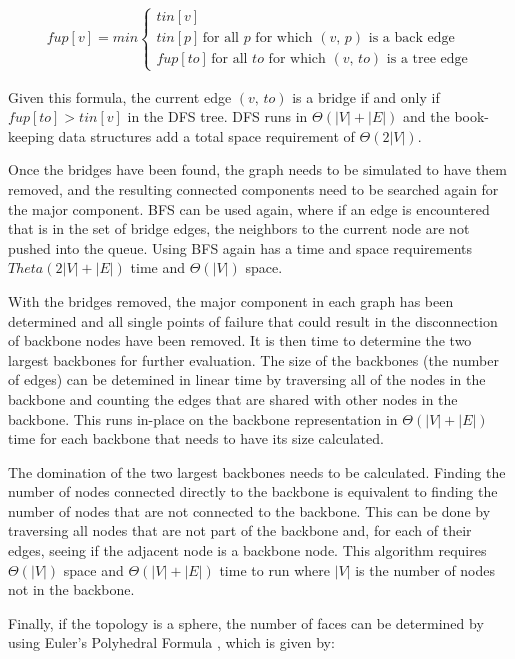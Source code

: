 \documentclass{article}
\begin{document}
        \begin{align}
            fup[v] = min
            \begin{cases}
                tin[v] \\
                tin[p]\,\text{for all $p$ for which $(v,\,p)$ is a back edge} \\
                fup[to]\,\text{for all $to$ for which $(v,\,to)$ is a tree edge}
            \end{cases}
        \end{align}

        Given this formula, the current edge $(v,\,to)$ is a bridge if and only if $fup[to] > tin[v]$ in the DFS tree. DFS runs in $\Theta(|V| + |E|)$ and the book-keeping data structures add a total space requirement of $\Theta(2|V|)$.
        \par
        Once the bridges have been found, the graph needs to be simulated to have them removed, and the resulting connected components need to be searched again for the major component. BFS can be used again, where if an edge is encountered that is in the set of bridge edges, the neighbors to the current node are not pushed into the queue. Using BFS again has a time and space requirements $Theta(2|V| + |E|)$ time and $\Theta(|V|)$ space.
        \par
        With the bridges removed, the major component in each graph has been determined and all single points of failure that could result in the disconnection of backbone nodes have been removed. It is then time to determine the two largest backbones for further evaluation. The size of the backbones (the number of edges) can be detemined in linear time by traversing all of the nodes in the backbone and counting the edges that are shared with other nodes in the backbone. This runs in-place on the backbone representation in $\Theta(|V| + |E|)$ time for each backbone that needs to have its size calculated.
        \par
        The domination of the two largest backbones needs to be calculated. Finding the number of nodes connected directly to the backbone is equivalent to finding the number of nodes that are not connected to the backbone. This can be done by traversing all nodes that are not part of the backbone and, for each of their edges, seeing if the adjacent node is a backbone node. This algorithm requires $\Theta(|V|)$ space and $\Theta(|V| + |E|)$ time to run where $|V|$ is the number of nodes not in the backbone.
        \par
        Finally, if the topology is a sphere, the number of faces can be determined by using Euler's Polyhedral Formula \cite{euler}, which is given by:
\end{document}
